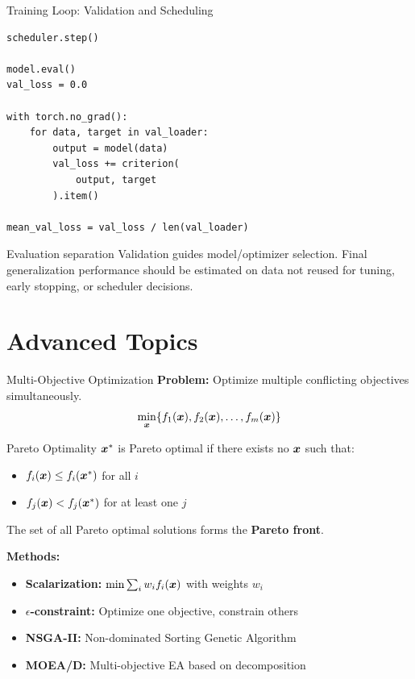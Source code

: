 \documentclass[aspectratio=169]{beamer}
\begin{document}
\begin{frame}[fragile]{Training Loop: Validation and Scheduling}
\begin{lstlisting}[style=code,basicstyle=\ttfamily\small]
scheduler.step()

model.eval()
val_loss = 0.0

with torch.no_grad():
    for data, target in val_loader:
        output = model(data)
        val_loss += criterion(
            output, target
        ).item()

mean_val_loss = val_loss / len(val_loader)
\end{lstlisting}

\begin{alertblock}{Evaluation separation}
Validation guides model/optimizer selection. Final generalization performance should be estimated on data not reused for tuning, early stopping, or scheduler decisions.
\end{alertblock}
\end{frame}

\section{Advanced Topics}

\begin{frame}{Multi-Objective Optimization}
  \textbf{Problem:} Optimize multiple conflicting objectives simultaneously.
  $$\min_{\boldsymbol{x}} \{f_1(\boldsymbol{x}), f_2(\boldsymbol{x}), \ldots, f_m(\boldsymbol{x})\}$$

  \vspace{0.5em}

  \begin{definitionbox}{Pareto Optimality}
    $\boldsymbol{x}^*$ is Pareto optimal if there exists no $\boldsymbol{x}$ such that:
    \begin{itemize}
      \item $f_i(\boldsymbol{x}) \leq f_i(\boldsymbol{x}^*)$ for all $i$
      \item $f_j(\boldsymbol{x}) < f_j(\boldsymbol{x}^*)$ for at least one $j$
    \end{itemize}
    The set of all Pareto optimal solutions forms the \textbf{Pareto front}.
  \end{definitionbox}

  \vspace{0.5em}

  \textbf{Methods:}
  \begin{itemize}
    \item \textbf{Scalarization:} $\min \sum_i w_i f_i(\boldsymbol{x})$ with weights $w_i$
    \item \textbf{$\epsilon$-constraint:} Optimize one objective, constrain others
    \item \textbf{NSGA-II:} Non-dominated Sorting Genetic Algorithm
    \item \textbf{MOEA/D:} Multi-objective EA based on decomposition
  \end{itemize}
\end{frame}
\end{document}
